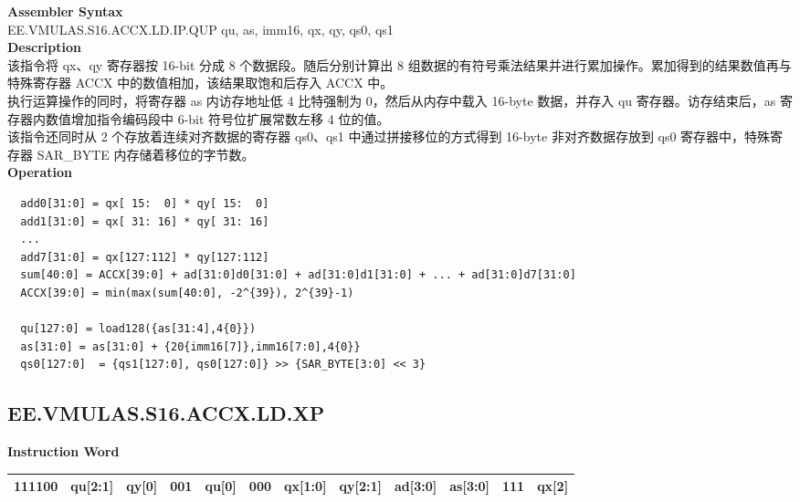 \textbf{Assembler Syntax} \\
EE.VMULAS.S16.ACCX.LD.IP.QUP qu, as, imm16, qx, qy, qs0, qs1 \\
\textbf{Description} \\
该指令将 qx、qy 寄存器按 16-bit 分成 8 个数据段。随后分别计算出 8 组数据的有符号乘法结果并进行累加操作。累加得到的结果数值再与特殊寄存器 ACCX 中的数值相加，该结果取饱和后存入 ACCX 中。\\
执行运算操作的同时，将寄存器 as 内访存地址低 4 比特强制为 0，然后从内存中载入 16-byte 数据，并存入 qu 寄存器。访存结束后，as 寄存器内数值增加指令编码段中 6-bit 符号位扩展常数左移 4 位的值。\\
该指令还同时从 2 个存放着连续对齐数据的寄存器 qs0、qs1 中通过拼接移位的方式得到 16-byte 非对齐数据存放到 qs0 寄存器中，特殊寄存器 SAR\_BYTE 内存储着移位的字节数。\\
\textbf{Operation}
\begin{lstlisting}
  add0[31:0] = qx[ 15:  0] * qy[ 15:  0]
  add1[31:0] = qx[ 31: 16] * qy[ 31: 16]
  ...
  add7[31:0] = qx[127:112] * qy[127:112]
  sum[40:0] = ACCX[39:0] + ad[31:0]d0[31:0] + ad[31:0]d1[31:0] + ... + ad[31:0]d7[31:0]
  ACCX[39:0] = min(max(sum[40:0], -2^{39}), 2^{39}-1)

  qu[127:0] = load128({as[31:4],4{0}})
  as[31:0] = as[31:0] + {20{imm16[7]},imm16[7:0],4{0}}
  qs0[127:0]  = {qs1[127:0], qs0[127:0]} >> {SAR_BYTE[3:0] << 3}
\end{lstlisting}

\clearpage
\subsection{EE.VMULAS.S16.ACCX.LD.XP}\label{instruction:EEVMULASS16ACCXLDXP}
\setlength\tabcolsep{6pt}
\textbf{Instruction Word} \\
\begin{tabular}{|c|c|c|c|c|c|c|c|c|c|c|c|}
	\hline
	111100 & qu[2:1] & qy[0] & 001 & qu[0] & 000 & qx[1:0] & qy[2:1] & ad[3:0] & as[3:0] & 111 & qx[2] \\
	\hline
\end{tabular}


